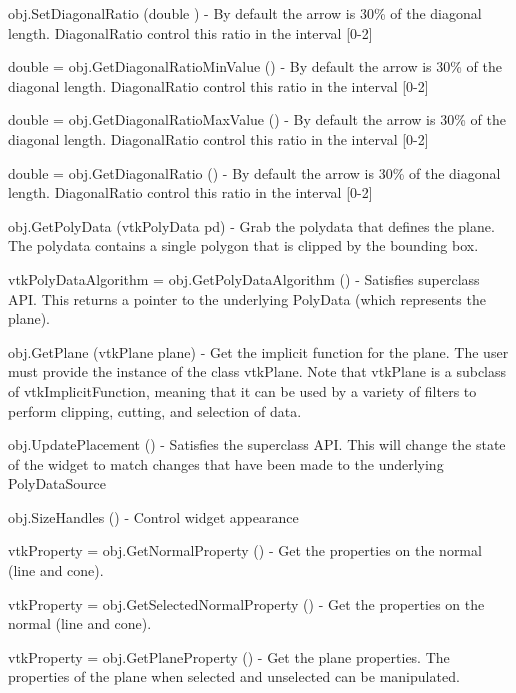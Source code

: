\begin{DoxyItemize}
\item {\ttfamily obj.\-Set\-Diagonal\-Ratio (double )} -\/ By default the arrow is 30\% of the diagonal length. Diagonal\-Ratio control this ratio in the interval \mbox{[}0-\/2\mbox{]}  
\item {\ttfamily double = obj.\-Get\-Diagonal\-Ratio\-Min\-Value ()} -\/ By default the arrow is 30\% of the diagonal length. Diagonal\-Ratio control this ratio in the interval \mbox{[}0-\/2\mbox{]}  
\item {\ttfamily double = obj.\-Get\-Diagonal\-Ratio\-Max\-Value ()} -\/ By default the arrow is 30\% of the diagonal length. Diagonal\-Ratio control this ratio in the interval \mbox{[}0-\/2\mbox{]}  
\item {\ttfamily double = obj.\-Get\-Diagonal\-Ratio ()} -\/ By default the arrow is 30\% of the diagonal length. Diagonal\-Ratio control this ratio in the interval \mbox{[}0-\/2\mbox{]}  
\item {\ttfamily obj.\-Get\-Poly\-Data (vtk\-Poly\-Data pd)} -\/ Grab the polydata that defines the plane. The polydata contains a single polygon that is clipped by the bounding box.  
\item {\ttfamily vtk\-Poly\-Data\-Algorithm = obj.\-Get\-Poly\-Data\-Algorithm ()} -\/ Satisfies superclass A\-P\-I. This returns a pointer to the underlying Poly\-Data (which represents the plane).  
\item {\ttfamily obj.\-Get\-Plane (vtk\-Plane plane)} -\/ Get the implicit function for the plane. The user must provide the instance of the class vtk\-Plane. Note that vtk\-Plane is a subclass of vtk\-Implicit\-Function, meaning that it can be used by a variety of filters to perform clipping, cutting, and selection of data.  
\item {\ttfamily obj.\-Update\-Placement ()} -\/ Satisfies the superclass A\-P\-I. This will change the state of the widget to match changes that have been made to the underlying Poly\-Data\-Source  
\item {\ttfamily obj.\-Size\-Handles ()} -\/ Control widget appearance  
\item {\ttfamily vtk\-Property = obj.\-Get\-Normal\-Property ()} -\/ Get the properties on the normal (line and cone).  
\item {\ttfamily vtk\-Property = obj.\-Get\-Selected\-Normal\-Property ()} -\/ Get the properties on the normal (line and cone).  
\item {\ttfamily vtk\-Property = obj.\-Get\-Plane\-Property ()} -\/ Get the plane properties. The properties of the plane when selected and unselected can be manipulated.  

\end{DoxyItemize}

